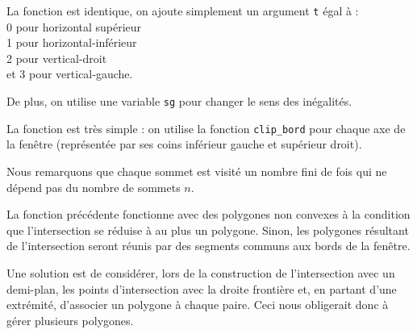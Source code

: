 \begin{center}
\end{center}



\Q
La fonction est identique, on ajoute simplement un argument \texttt{t} égal à :\\
0 pour horizontal supérieur\\
1 pour horizontal-inférieur\\
2 pour vertical-droit\\
et 3 pour vertical-gauche.
\medskip

De plus, on utilise une variable \texttt{sg} pour changer le sens des inégalités.
\newpage



\Q
La fonction est très simple : on utilise la fonction \texttt{clip\_bord} pour chaque axe de la fenêtre (représentée par ses coins inférieur gauche et supérieur droit).



Nous remarquons que chaque sommet est visité un nombre fini de fois qui ne dépend pas du nombre de sommets $n$.

\Q
La fonction précédente fonctionne avec des polygones non convexes à la condition que l'intersection se réduise à au plus un polygone. Sinon, les polygones résultant de l'intersection seront réunis par des segments communs aux bords de la fenêtre.

\begin{center}
\end{center}

Une solution est de considérer, lors de la construction de l'intersection avec un demi-plan, les points d'intersection avec la droite frontière et, en partant d'une extrémité, d'associer un polygone à chaque paire. Ceci nous obligerait donc à gérer plusieurs polygones.
\bigskip

\Fin

